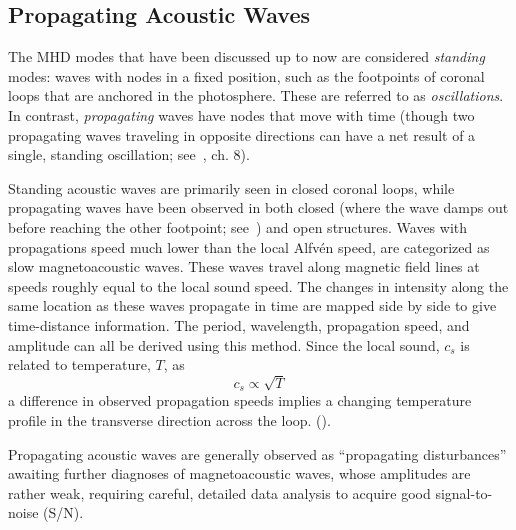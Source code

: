 \documentclass[preprint2]{aastex}
\begin{document}
\subsection{Propagating Acoustic Waves}
The MHD modes that have been discussed up to now are considered
\emph{standing} modes: waves with nodes in a fixed
position, such as the footpoints of coronal loops that are anchored in
the photosphere. These are referred to as \emph{oscillations}.
In contrast, \emph{propagating} waves have nodes that move with time
(though two propagating waves traveling in opposite directions can
have a net result of a single, standing oscillation; see~\cite{Asc},
ch. 8).

Standing acoustic waves are primarily seen in closed coronal
loops, while propagating waves have been observed in both closed
(where the wave damps out before reaching the other footpoint;
see~\cite{acoustic_1})
and open structures.
Waves with propagations speed much lower than the
local Alfv\'en speed, are categorized as slow magnetoacoustic waves.
These waves travel along magnetic field lines at speeds roughly equal to
the local sound speed.
The changes in intensity along the same location as these waves
propagate in time are mapped side by side to give time-distance
information. The period, wavelength, propagation speed, and amplitude
can all be derived using this method.
Since the local sound, $c_{s}$ is related to temperature, $T$, as
\begin{equation}\label{sound-temp}
 c_{s} \propto \sqrt{T}
\end{equation}
a difference in observed propagation speeds implies a changing
temperature profile in the transverse direction across the loop.
(\cite{Nak}).

Propagating acoustic waves are generally observed as ``propagating
disturbances'' awaiting further diagnoses of magnetoacoustic waves,
whose amplitudes are rather weak, requiring careful, detailed data
analysis to acquire good signal-to-noise (S/N).
\end{document}
